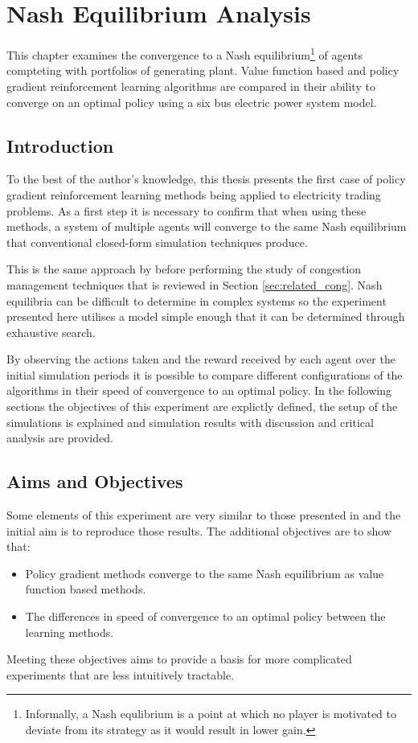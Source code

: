 \chapter{Nash Equilibrium Analysis}
\label{ch:learningtotrade}
This chapter examines the convergence to a Nash
equilibrium\footnote{Informally, a Nash equlibrium is a point at which no
player is motivated to deviate from its strategy as it would result in lower
gain.} of agents compteting with portfolios of generating plant.  Value
function based and policy gradient reinforcement learning algorithms are
compared in their ability to converge on an optimal policy using a six bus
electric power system model.

\section{Introduction}
To the best of the author's knowledge, this thesis presents the first case of
policy gradient reinforcement learning methods being applied to electricity
trading problems.  As a first step it is necessary to confirm that when using
these methods, a system of multiple agents will converge to the same Nash
equilibrium that conventional closed-form simulation techniques produce.

This is the same approach by  before performing the study
of congestion management techniques that is reviewed in Section
\ref{sec:related_cong}.  Nash equilibria can be difficult
to determine in complex systems so the experiment presented here utilises a
model simple enough that it can be determined through exhaustive search.

By observing the actions taken and the reward received by each agent over the
initial simulation periods it is possible to compare different configurations
of the algorithms in their speed of convergence to an optimal policy.  In the
following sections the objectives of this experiment are explictly defined, the
setup of the simulations is explained and simulation results with discussion
and critical analysis are provided.

\section{Aims and Objectives}
Some elements of this experiment are very similar to those presented in
 and the initial aim is to reproduce those results.
The additional objectives are to show that:
\begin{itemize}
  \item Policy gradient methods converge to the same Nash equilibrium as value
  function based methods.
  \item The differences in speed of convergence to an optimal policy between
  the learning methods.
\end{itemize}
Meeting these objectives aims to provide a basis for more complicated
experiments that are less intuitively tractable.

